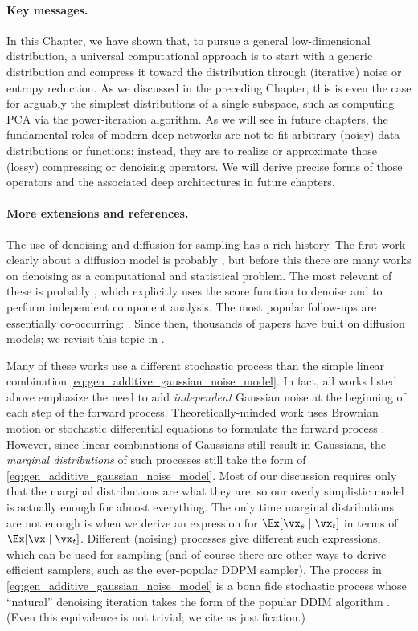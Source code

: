 \documentclass[../../book-main.tex]{subfiles}
\begin{document}
\paragraph{Key messages.}
In this Chapter, we have shown that, to pursue a general
low-dimensional distribution, a universal computational approach is
to start with a generic distribution and compress it toward the
distribution through (iterative) noise or entropy reduction. As we
discussed in the preceding Chapter, this is even the case for
arguably the simplest distributions of a single subspace, such as
computing PCA via the power-iteration algorithm. As we will see in
future chapters, the fundamental roles of modern deep networks are
not to fit arbitrary (noisy) data distributions or functions;
instead, they are to realize or approximate those (lossy) compressing
or denoising operators. We will derive precise forms of those
operators and the associated deep architectures in future chapters.

\paragraph{More extensions and references.}
The use of denoising and diffusion for sampling has a rich history.
The first work clearly about a diffusion model is probably
\cite{Sohl-Dickstein2015}, but before this there are many works on
denoising as a computational and statistical problem. The most
relevant of these is probably \cite{hyvarinen05a}, which explicitly
uses the score function to denoise and to perform independent
component analysis. The most popular follow-ups are essentially
co-occurring: \cite{ho2020denoising,song2019}. Since then, thousands
of papers have built on diffusion models; we revisit this topic in
.

Many of these works use a different stochastic process than the
simple linear combination
\eqref{eq:gen_additive_gaussian_noise_model}. In fact, all works
listed above emphasize the need to add \textit{independent} Gaussian
noise at the beginning of each step of the forward process.
Theoretically-minded work uses Brownian motion or stochastic
differential equations to formulate the forward process
\cite{song2020score}. However, since linear combinations of Gaussians
still result in Gaussians, the \textit{marginal distributions} of
such processes still take the form of
\eqref{eq:gen_additive_gaussian_noise_model}. Most of our discussion
requires only that the marginal distributions are what they are, so
our overly simplistic model is actually enough for almost everything.
The only time marginal distributions are not enough is when we derive
an expression for \(\Ex[\vx_{s} \mid \vx_{t}]\) in terms of
\(\Ex[\vx \mid \vx_{t}]\). Different (noising) processes give
different such expressions, which can be used for sampling (and of
    course there are other ways to derive efficient samplers, such as the
ever-popular DDPM sampler). The process in
\eqref{eq:gen_additive_gaussian_noise_model} is a bona fide
stochastic process whose ``natural'' denoising iteration takes the
form of the popular DDIM algorithm
\cite{song2020denoising}. (Even this equivalence is not trivial; we
cite \cite{de2025distributional} as justification.)
\end{document}
